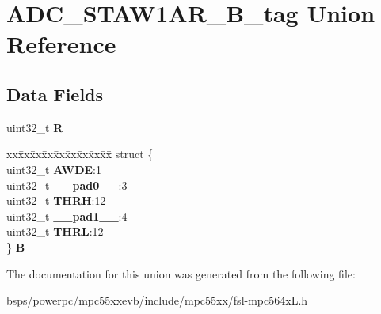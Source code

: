 \hypertarget{unionADC__STAW1AR__32B__tag}{}\section{A\+D\+C\+\_\+\+S\+T\+A\+W1\+A\+R\+\_\+B\+\_\+tag Union Reference}
\label{unionADC__STAW1AR__32B__tag}
\subsection*{Data Fields}
\begin{DoxyCompactItemize}
\item 
\mbox{\label{unionADC__STAW1AR__32B__tag_a50e4ea0a5d13e6e810849cb8215e11dd}} 
uint32\+\_\+t {\bfseries R}
\item 
\mbox{\label{unionADC__STAW1AR__32B__tag_a1c87a4c53847f104a8a2d6cc8a2ae4a4}} 
\begin{tabbing}
xx\=xx\=xx\=xx\=xx\=xx\=xx\=xx\=xx\=\kill
struct \{\\
\>uint32\_t {\bfseries AWDE}:1\\
\>uint32\_t {\bfseries \_\_pad0\_\_}:3\\
\>uint32\_t {\bfseries THRH}:12\\
\>uint32\_t {\bfseries \_\_pad1\_\_}:4\\
\>uint32\_t {\bfseries THRL}:12\\
\} {\bfseries B}\\

\end{tabbing}\end{DoxyCompactItemize}


The documentation for this union was generated from the following file\+:\begin{DoxyCompactItemize}
\item 
bsps/powerpc/mpc55xxevb/include/mpc55xx/fsl-\/mpc564x\+L.\+h\end{DoxyCompactItemize}
